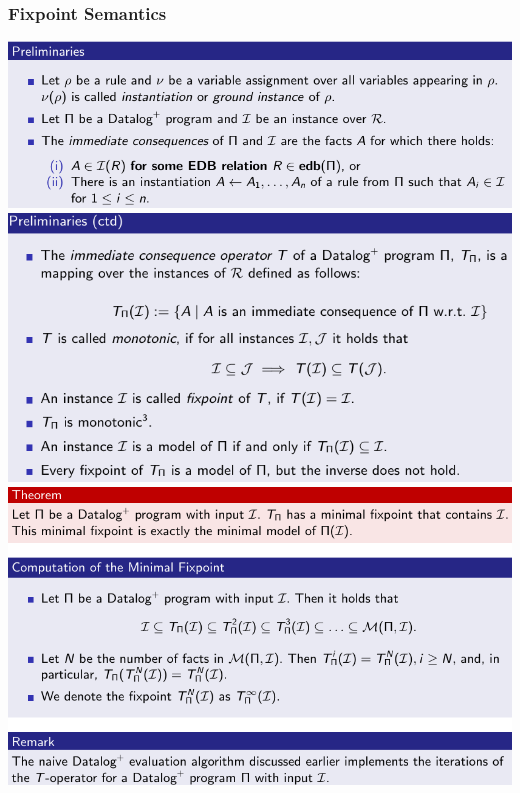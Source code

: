 \documentclass{article}
\begin{document}
\subsubsection{Fixpoint Semantics}
\includegraphics[scale=0.3]{84.png}\\
\includegraphics[scale=0.3]{85.png}\\
\includegraphics[scale=0.3]{86.png}\\
\end{document}
